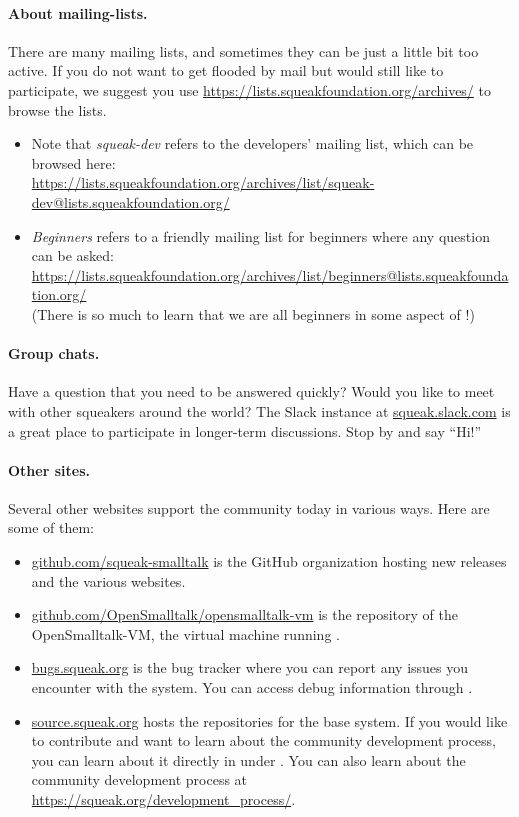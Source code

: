 \documentclass[a4paper,10pt,twoside]{book}
\begin{document}
\paragraph{About mailing-lists.}
There are many mailing lists, and sometimes they can be just a little bit too active.
If you do not want to get flooded by mail but would still like to participate, we suggest you use \url{https://lists.squeakfoundation.org/archives/} to browse the lists.

\begin{itemize}
\item Note that \emph{squeak-dev} refers to the developers' mailing list, which can be browsed here:\\
\url{https://lists.squeakfoundation.org/archives/list/squeak-dev@lists.squeakfoundation.org/}
\item \emph{Beginners} refers to a friendly mailing list for beginners where any question can be asked:\\
\url{https://lists.squeakfoundation.org/archives/list/beginners@lists.squeakfoundation.org/}\\
(There is so much to learn that we are all beginners in some aspect of \sq!)
\end{itemize}

\paragraph{Group chats.}
Have a question that you need to be answered quickly?
Would you like to meet with other squeakers around the world?
The Slack instance at \url{squeak.slack.com} is a great place to participate in longer-term discussions.
Stop by and say ``Hi!''

\paragraph{Other sites.} Several other websites support the \sq community today in various ways.
Here are some of them:
\begin{itemize}
  \item \url{github.com/squeak-smalltalk} is the GitHub organization hosting new releases and the various \sq websites.

  \item \url{github.com/OpenSmalltalk/opensmalltalk-vm} is the repository of the OpenSmalltalk-VM, the virtual machine running \sq.

  \item \url{bugs.squeak.org} is the bug tracker where you can report any issues you encounter with the system. You can access debug information through .
  
  \item \url{source.squeak.org} hosts the repositories for the base system. If you would like to contribute and want to learn about the community development process, you can learn about it directly in \Squeak under . You can also learn about the community development process at \url{https://squeak.org/development_process/}.

\end{itemize}
\end{document}
